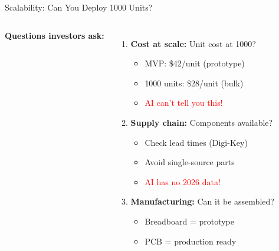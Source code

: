 \documentclass[aspectratio=169,11pt]{beamer}
\begin{document}
\begin{frame}[shrink=10]{Scalability: Can You Deploy 1000 Units?}
    \begin{columns}
        \textbf{Questions investors ask:}
        
        \vspace{0.1cm}
        \begin{enumerate}
            \item \textbf{Cost at scale:} Unit cost at 1000?
            \begin{itemize}
                \item MVP: \$42/unit (prototype)
                \item 1000 units: \$28/unit (bulk)
                \item \textcolor{red}{AI can't tell you this!}
            \end{itemize}
            
            \item \textbf{Supply chain:} Components available?
            \begin{itemize}
                \item Check lead times (Digi-Key)
                \item Avoid single-source parts
                \item \textcolor{red}{AI has no 2026 data!}
            \end{itemize}
            
            \item \textbf{Manufacturing:} Can it be assembled?
            \begin{itemize}
                \item Breadboard = prototype
                \item PCB = production ready
            \end{itemize}
        \end{enumerate}
        
\end{columns}
\end{frame}
\end{document}
